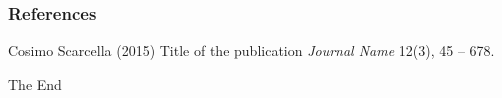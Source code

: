 \documentclass{beamer}
\begin{document}

\begin{frame}
\frametitle{References}
\footnotesize{
\begin{thebibliography}{99} %
 Cosimo Scarcella (2015)
\newblock Title of the publication
\newblock \emph{Journal Name} 12(3), 45 -- 678.
\end{thebibliography}
}
\end{frame}


\begin{frame}
\Huge{\centerline{The End}}
\end{frame}

\end{document}

